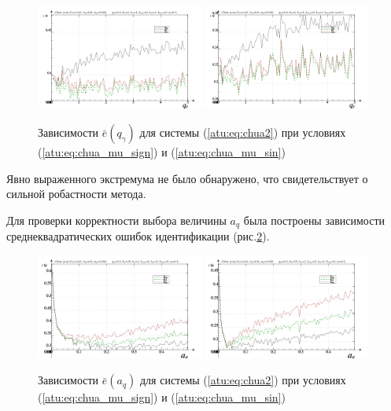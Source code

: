 \documentclass[a4paper,12pt]{article}
\begin{document}
\begin{figure}[htb!]
\centerline{
  \includegraphics[width=0.49\textwidth]{p/cha/chua/chua_m5p-p_qg_e_sign.png}
  \includegraphics[width=0.49\textwidth]{p/cha/chua/chua_m5p-p_qg_e_sin.png}
}
  \caption{Зависимости  $\bar{e}(q_\gamma)$ для системы (\ref{atu:eq:chua2})
  при условиях (\ref{atu:eq:chua_mu_sign}) и (\ref{atu:eq:chua_mu_sin})
}
\label{atu:f:chua_e_qgamma}
\end{figure}

Явно выраженного экстремума не было обнаружено, что свидетельствует
о сильной робастности метода.

Для проверки корректности выбора величины $a_q$ была построены зависимости
среднеквадратических ошибок идентификации (рис.\ref{atu:f:chua_e_a_q}).


\begin{figure}[htb!]
\centerline{
  \includegraphics[width=0.49\textwidth]{p/cha/chua/chua_m5p-p_a_q_e_sign.png}
  \includegraphics[width=0.49\textwidth]{p/cha/chua/chua_m5p-p_a_q_e_sin.png}
}
  \caption{Зависимости  $\bar{e}(a_q)$ для системы (\ref{atu:eq:chua2})
  при условиях (\ref{atu:eq:chua_mu_sign}) и (\ref{atu:eq:chua_mu_sin})
}
\label{atu:f:chua_e_a_q}
\end{figure}
\end{document}

